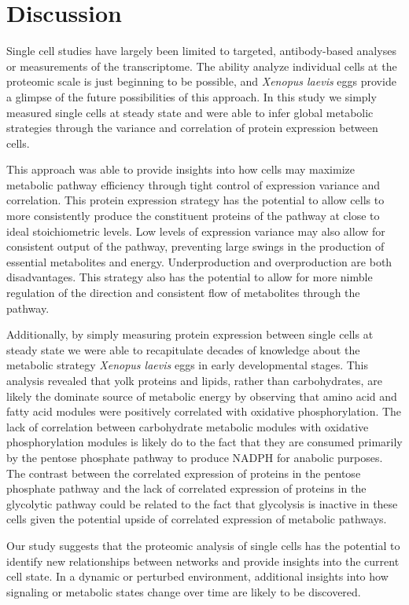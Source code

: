 \section{Discussion} \label{Discussion}

Single cell studies have largely been limited to targeted, antibody-based analyses or measurements of the transcriptome. The ability analyze individual cells at the proteomic scale is just beginning to be possible, and \emph{Xenopus laevis} eggs provide a glimpse of the future possibilities of this approach. In this study we simply measured single cells at steady state and were able to infer global metabolic strategies through the variance and correlation of protein expression between cells.

This approach was able to provide insights into how cells may maximize metabolic pathway efficiency through tight control of expression variance and correlation. This protein expression strategy has the potential to allow cells to more consistently produce the constituent proteins of the pathway at close to ideal stoichiometric levels. Low levels of expression variance may also allow for consistent output of the pathway, preventing large swings in the production of essential metabolites and energy. Underproduction and overproduction are both disadvantages. This strategy also has the potential to allow for more nimble regulation of the direction and consistent flow of metabolites through the pathway.

Additionally, by simply measuring protein expression between single cells at steady state we were able to recapitulate decades of knowledge about the metabolic strategy \emph{Xenopus laevis} eggs in early developmental stages. This analysis revealed that yolk proteins and lipids, rather than carbohydrates, are likely the dominate source of metabolic energy by observing that amino acid and fatty acid modules were positively correlated with oxidative phosphorylation. The lack of correlation between carbohydrate metabolic modules with oxidative phosphorylation modules is likely do to the fact that they are consumed primarily by the pentose phosphate pathway to produce NADPH for anabolic purposes. The contrast between the correlated expression of proteins in the pentose phosphate pathway and the lack of correlated expression of proteins in the glycolytic pathway could be related to the fact that glycolysis is inactive in these cells given the potential upside of correlated expression of metabolic pathways.

Our study suggests that the proteomic analysis of single cells has the potential to identify new relationships between networks and provide insights into the current cell state. In a dynamic or perturbed environment, additional insights into how signaling or metabolic states change over time are likely to be discovered.


